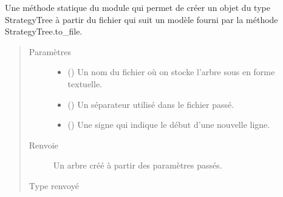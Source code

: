 \documentclass[letterpaper,10pt,french]{sphinxmanual}
\begin{document}
\begin{fulllineitems}
\label{\detokenize{index:StrategyTree.st_from_file}}
Une méthode statique du module qui permet de créer un objet du type StrategyTree à partir du fichier qui suit un
modèle fourni par la méthode StrategyTree.to\_file.
\begin{quote}\begin{description}
\item[{Paramètres}] \leavevmode\begin{itemize}
\item {} 
 (\sphinxstyleliteralemphasis{\sphinxupquote{, }}) \textendash{} Un nom du fichier où on stocke l’arbre sous en forme textuelle.

\item {} 
 (\sphinxstyleliteralemphasis{\sphinxupquote{, }}) \textendash{} Un séparateur utilisé dans le fichier passé.

\item {} 
 (\sphinxstyleliteralemphasis{\sphinxupquote{, }}) \textendash{} Une signe qui indique le début d’une nouvelle ligne.

\end{itemize}

\item[{Renvoie}] \leavevmode
{} \textendash{} Un arbre créé à partir des paramètres passés.

\item[{Type renvoyé}] \leavevmode
{\hyperref[\detokenize{index:StrategyTree.StrategyTree}]{}}

\end{description}\end{quote}

\end{fulllineitems}



\renewcommand{\indexname}{Index des modules Python}
\begin{sphinxtheindex}
\let\bigletter\sphinxstyleindexlettergroup
\bigletter{d}
\item\relax{}
\indexspace
\bigletter{s}
\item\relax{}
\end{sphinxtheindex}

\renewcommand{\indexname}{Index}
\printindex
\end{document}
